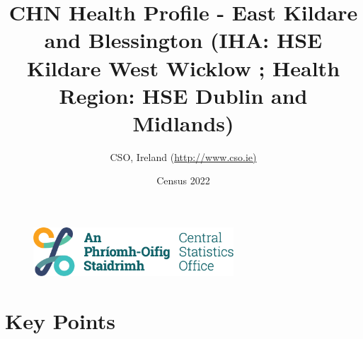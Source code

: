 \documentclass{article}
\title{CHN Health Profile - East Kildare and Blessington (IHA: HSE Kildare West Wicklow ;  Health Region: HSE Dublin and Midlands) }
\date{Census 2022}
\author{CSO, Ireland  (\url{http://www.cso.ie)}}
\begin{document}


\begin{figure}
	\centering
\includegraphics[width =75mm]{../figures/CSO_Logo.png}
\end{figure}

				 
		   
						  
														  
																																													
												 
			 
\maketitle
					
													   
				 
						 
																																																																											   
				 
				  
  \pagebreak
    	    \tableofcontents

\pagebreak


\section{Key Points}
\end{document}
